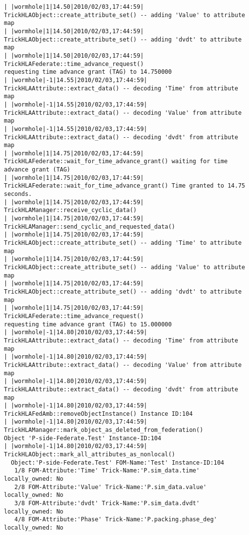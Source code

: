 \begin{lstlisting}[numbers=none,caption={output showing conditionally sent cyclic data}]
| |wormhole|1|14.50|2010/02/03,17:44:59| TrickHLAObject::create_attribute_set() -- adding 'Value' to attribute map
| |wormhole|1|14.50|2010/02/03,17:44:59| TrickHLAObject::create_attribute_set() -- adding 'dvdt' to attribute map
| |wormhole|1|14.50|2010/02/03,17:44:59| TrickHLAFederate::time_advance_request()   
requesting time advance grant (TAG) to 14.750000
| |wormhole|-1|14.55|2010/02/03,17:44:59| TrickHLAAttribute::extract_data() -- decoding 'Time' from attribute map
| |wormhole|-1|14.55|2010/02/03,17:44:59| TrickHLAAttribute::extract_data() -- decoding 'Value' from attribute map
| |wormhole|-1|14.55|2010/02/03,17:44:59| TrickHLAAttribute::extract_data() -- decoding 'dvdt' from attribute map
| |wormhole|1|14.75|2010/02/03,17:44:59| TrickHLAFederate::wait_for_time_advance_grant() waiting for time advance grant (TAG)
| |wormhole|1|14.75|2010/02/03,17:44:59| TrickHLAFederate::wait_for_time_advance_grant() Time granted to 14.75 seconds.
| |wormhole|1|14.75|2010/02/03,17:44:59| TrickHLAManager::receive_cyclic_data()
| |wormhole|1|14.75|2010/02/03,17:44:59| TrickHLAManager::send_cyclic_and_requested_data()
| |wormhole|1|14.75|2010/02/03,17:44:59| TrickHLAObject::create_attribute_set() -- adding 'Time' to attribute map
| |wormhole|1|14.75|2010/02/03,17:44:59| TrickHLAObject::create_attribute_set() -- adding 'Value' to attribute map
| |wormhole|1|14.75|2010/02/03,17:44:59| TrickHLAObject::create_attribute_set() -- adding 'dvdt' to attribute map
| |wormhole|1|14.75|2010/02/03,17:44:59| TrickHLAFederate::time_advance_request()   
requesting time advance grant (TAG) to 15.000000
| |wormhole|-1|14.80|2010/02/03,17:44:59| TrickHLAAttribute::extract_data() -- decoding 'Time' from attribute map
| |wormhole|-1|14.80|2010/02/03,17:44:59| TrickHLAAttribute::extract_data() -- decoding 'Value' from attribute map
| |wormhole|-1|14.80|2010/02/03,17:44:59| TrickHLAAttribute::extract_data() -- decoding 'dvdt' from attribute map
| |wormhole|-1|14.80|2010/02/03,17:44:59| TrickHLAFedAmb::removeObjectInstance() Instance ID:104
| |wormhole|-1|14.80|2010/02/03,17:44:59| TrickHLAManager::mark_object_as_deleted_from_federation()
Object 'P-side-Federate.Test' Instance-ID:104
| |wormhole|-1|14.80|2010/02/03,17:44:59| TrickHLAObject::mark_all_attributes_as_nonlocal()
  Object:'P-side-Federate.Test' FOM-Name:'Test' Instance-ID:104
   1/8 FOM-Attribute:'Time' Trick-Name:'P.sim_data.time' locally_owned: No
   2/8 FOM-Attribute:'Value' Trick-Name:'P.sim_data.value' locally_owned: No
   3/8 FOM-Attribute:'dvdt' Trick-Name:'P.sim_data.dvdt' locally_owned: No
   4/8 FOM-Attribute:'Phase' Trick-Name:'P.packing.phase_deg' locally_owned: No

\end{lstlisting}
